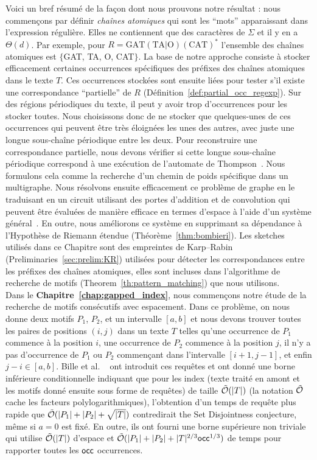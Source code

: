 Voici un bref résumé de la façon dont nous prouvons notre résultat : nous commençons par définir \emph{chaînes atomiques} qui sont les ``mots'' apparaissant dans l'expression régulière. Elles ne contiennent que des caractères de $\Sigma$ et il y en a $\Theta(d)$. Par exemple, pour $R= \mathrm{GAT}(\mathrm{TA} | \mathrm{O})(\mathrm{CAT})^*$ l'ensemble des chaînes atomiques est $\{$GAT, TA, O, CAT$\}$.
%
La base de notre approche consiste à stocker efficacement certaines occurrences spécifiques des préfixes des chaînes atomiques dans le texte $T$. Ces occurrences stockées sont ensuite liées pour tester s'il existe une correspondance ``partielle'' de $R$ (Définition~\ref*{def:partial_occ_regexp}).
Sur des régions périodiques du texte, il peut y avoir trop d'occurrences pour les stocker toutes.
Nous choisissons donc de ne stocker que quelques-unes de ces occurrences qui peuvent être très éloignées les unes des autres, avec juste une longue sous-chaîne périodique entre les deux. Pour reconstruire une correspondance partielle, nous devons vérifier si cette longue sous-chaîne périodique correspond à une exécution de l'automate de Thompson~\cite{Thompson_automaton}. Nous formulons cela comme la recherche d'un chemin de poids spécifique dans un multigraphe. Nous résolvons ensuite efficacement ce problème de graphe en le traduisant en un circuit utilisant des portes d'addition et de convolution qui peuvent être évaluées de manière efficace en termes d'espace à l'aide d'un système général~\cite{LokshtanovN10,Bringmann17}. En outre, nous améliorons ce système en supprimant sa dépendance à l'Hypothèse de Riemann étendue (Théorème~\ref{thm:bombieri}). 
%
Les sketches utilisés dans ce Chapitre sont des empreintes de Karp--Rabin (Preliminaries~\ref{sec:prelim:KR}) utilisées pour détecter les correspondances entre les préfixes des chaînes atomiques, elles sont incluses dans l'algorithme de recherche de motifs (Theorem~\ref{th:pattern_matching}) que nous utilisons.\\

Dans le \textbf{Chapitre~\ref{chap:gapped_index}}, nous commençons notre étude de la recherche de motifs consécutifs avec espacement. Dans ce problème, on nous donne deux motifs $P_1$, $P_2$, et un intervalle $[a,b]$ et nous devons trouver toutes les paires de positions $(i,j)$ dans un texte $T$ telles qu'une occurrence de $P_1$ commence à la position $i$, une occurrence de $P_2$ commence à la position $j$, il n'y a pas d'occurrence de $P_1$ ou $P_2$ commençant dans l'intervalle $[i+1,j-1]$, et enfin $j-i \in [a,b]$.
%
Bille et al. ~\cite{bille2022gapped} ont introduit ces requêtes et ont donné une borne inférieure conditionnelle indiquant que pour les index (texte traité en amont et les motifs donné ensuite sous forme de requêtes) de taille $\tilde {\mathcal{O}}(|T|)$ (la notation $\tilde {\mathcal{O}}$ cache les facteurs polylogarithmiques), l'obtention d'un temps de requête plus rapide que $\tilde {\mathcal{O}}(|P_1|+|P_2|+\sqrt{|T|})$ contredirait the Set Disjointness conjecture, même si $a=0$ est fixé. En outre, ils ont fourni une borne supérieure non triviale qui utilise $\tilde {\mathcal{O}}(|T|)$ d'espace et $\tilde {\mathcal{O}} (|P_1| +|P_2| + |T|^{2/3}\mathsf{occ}^{1/3})$ de temps pour rapporter toutes les $\mathsf{occ}$ occurrences.

